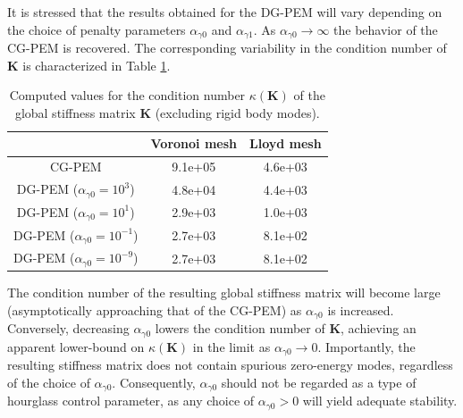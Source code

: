 It is stressed that the results obtained for the DG-PEM will vary depending on the choice of penalty parameters $\alpha_{\gamma0}$ and $\alpha_{\gamma1}$. As $\alpha_{\gamma0} \rightarrow \infty$ the behavior of the CG-PEM is recovered. The corresponding variability in the condition number of $\mathbf{K}$ is characterized in Table \ref{tab:global_stiffness_condition_number}.
\begin{table}[!ht]
  \begin{center}
    \begin{tabular}{| c || c | c |}
    \hline
           & Voronoi mesh & Lloyd mesh \\ \hline \hline
    CG-PEM & 9.1e+05 & 4.6e+03 \\ \hline
    DG-PEM ($\alpha_{\gamma0} = 10^3$) & 4.8e+04 & 4.4e+03 \\ \hline
    DG-PEM ($\alpha_{\gamma0} = 10^1$) & 2.9e+03 & 1.0e+03 \\ \hline
    DG-PEM ($\alpha_{\gamma0} = 10^{-1}$) & 2.7e+03 & 8.1e+02  \\ \hline
    DG-PEM ($\alpha_{\gamma0} = 10^{-9}$) & 2.7e+03 & 8.1e+02 \\
    \hline
    \end{tabular}
    \caption{Computed values for the condition number $\kappa(\mathbf{K})$ of the global stiffness matrix $\mathbf{K}$ (excluding rigid body modes).}
    \vspace{-5pt}
    \label{tab:global_stiffness_condition_number}
    \vspace{-25pt}
  \end{center}
\end{table}

The condition number of the resulting global stiffness matrix will become large (asymptotically approaching that of the CG-PEM) as $\alpha_{\gamma0}$ is increased. Conversely, decreasing $\alpha_{\gamma0}$ lowers the condition number of $\mathbf{K}$, achieving an apparent lower-bound on $\kappa (\mathbf{K})$ in the limit as $\alpha_{\gamma0} \rightarrow 0$. Importantly, the resulting stiffness matrix does not contain spurious zero-energy modes, regardless of the choice of $\alpha_{\gamma0}$. Consequently, $\alpha_{\gamma0}$ should not be regarded as a type of hourglass control parameter, as any choice of $\alpha_{\gamma0} > 0$ will yield adequate stability.



